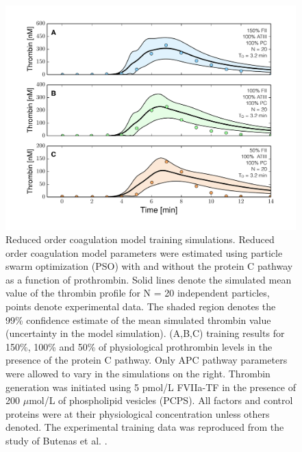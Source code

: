 \documentclass[12pt]{article}
\begin{document}
\begin{figure}
\centering
\includegraphics[width=1.0\textwidth]{./figs/Figure-4-DIFF_FII_APC.pdf}
\caption{Reduced order coagulation model training simulations.
Reduced order coagulation model parameters were estimated using particle swarm optimization (PSO) with and without the protein C pathway as a function of prothrombin. 
Solid lines denote the simulated mean value of the thrombin profile for N = 20 independent particles, points denote experimental data.
The shaded region denotes the 99\% confidence estimate of the mean simulated thrombin value (uncertainty in the model simulation).
(A,B,C) training results for 150\%, 100\% and 50\% of physiological prothrombin levels in the presence of the protein C pathway. 
Only APC pathway parameters were allowed to vary in the simulations on the right.
Thrombin generation was initiated using 5 pmol/L FVIIa-TF in the presence of 200 $\mu$mol/L of phospholipid vesicles (PCPS). 
All factors and control proteins were at their physiological concentration unless others denoted.
The experimental training data was reproduced from the study of Butenas et al. \citep{Butenas:1999aa}.}\label{fig-diff_fII_APC}
\end{figure}

\clearpage
\end{document}
